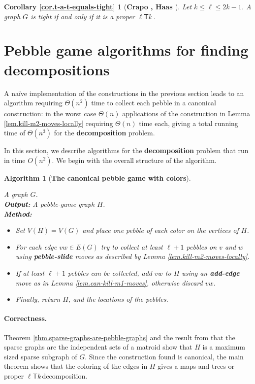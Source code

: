 \documentclass[Svgc,nospthms]{Svgc}
\newcommand{\ellteekay}{\ensuremath{\ell{\mathsf T}k}\,}
\newtheorem{algorithm}[theorem]{Algorithm}
\newcommand{\reflem}[1]{Lemma \ref{lem.#1}}
\newcommand{\refthm}[1]{Theorem \ref{thm.#1}}
\newcommand{\refcor}[1]{Corollary \ref{cor.#1}}
\newcommand{\labelalg}[1]{\label{alg.#1}}
\newcommand{\restateenv}{ZZZ}
\newenvironment{restatecor}[1]{
  \renewcommand{\restateenv}{restate.#1}
  \newtheorem*{\restateenv}{\refcor{#1}}
  \begin{\restateenv}
}{\end{\restateenv}}
\begin{document}
	\begin{restatecor}{t-a-t-equals-tight}[\textbf{Crapo \cite{crapo:rigidity:88}, Haas \cite{haas:2002}}] 
		Let $k\le \ell\le 2k-1$. A graph $G$ is tight if and only if it is a proper \ellteekay.
	\end{restatecor}
	
	\section{Pebble game algorithms for finding decompositions}
	A naïve implementation of the constructions in the previous section leads to an 
	algorithm requiring $\Theta(n^2)$ time to collect each pebble in a canonical 
	construction: in the worst case $\Theta(n)$ applications of the construction 
	in \reflem{kill-m2-moves-locally} requiring $\Theta(n)$ time each, giving a 
	total running time of $\Theta(n^3)$ for the \textbf{decomposition} problem.
	
	In this section, we describe algorithms for the {\bf decomposition} problem
	that run in time $O(n^2)$.  We begin with the overall structure of the algorithm.

	\begin{algorithm}
		[\textbf{The canonical pebble game with colors}]\labelalg{canonical-pebble-game}
\qquad 

 A graph $G$. \\
		{\bf Output:} A pebble-game graph $H$. \\
		{\bf Method:} 
		\begin{itemize}
			\item Set $V(H)=V(G)$ and place one pebble of each color on the vertices of $H$.
			\item 	For each edge $vw\in E(G)$ try to collect at least $\ell+1$ pebbles on $v$ and $w$ using {\bf pebble-slide} moves as described by \reflem{kill-m2-moves-locally}. 
			\item If at least $\ell+1$ pebbles can be collected, add $vw$ to $H$ using an {\bf add-edge} move as in \reflem{can-kill-m1-moves}, otherwise discard $vw$. 

			\item Finally, return $H$, and the locations of the pebbles.
		\end{itemize}
	\end{algorithm}
	
	\paragraph{Correctness.}  \refthm{sparse-graphs-are-pebble-graphs} and the
	result from \cite{whiteley:union-matroids} that the sparse graphs are the independent
	sets of a matroid show that $H$ is a maximum sized sparse subgraph of $G$.  Since
	the construction found is canonical, the main theorem shows that the coloring of 
	the edges in $H$ gives a maps-and-trees or proper \ellteekay decomposition.
\end{document}
